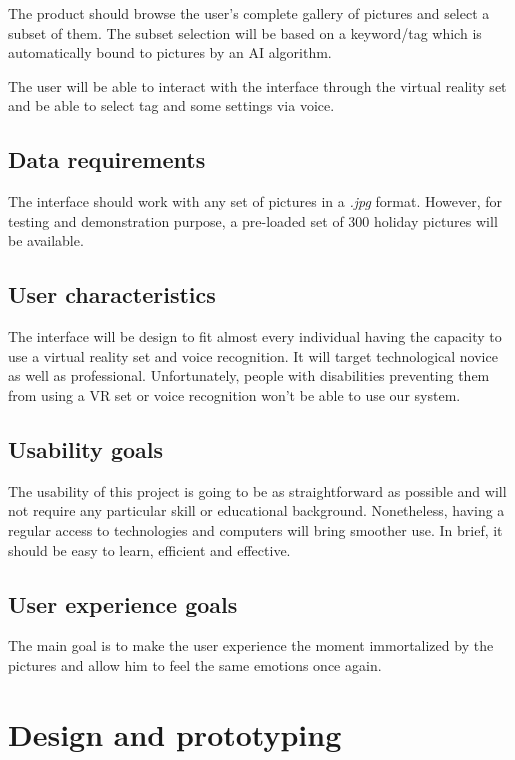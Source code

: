 \documentclass[11pt,a4paper]{article}
\begin{document}
The product should browse the user's complete gallery of pictures and select a subset of them. The subset selection will be based on a keyword/tag which is automatically bound to pictures by an AI algorithm.

The user will be able to interact with the interface through the virtual reality set and be able to select tag and some settings via voice.

\subsection{Data requirements}

The interface should work with any set of pictures in a \textit{.jpg} format. However, for testing and demonstration purpose, a pre-loaded set of 300 holiday pictures will be available.

\subsection{User characteristics}

The interface will be design to fit almost every individual having the capacity to use a virtual reality set and voice recognition. It will target technological novice as well as professional. Unfortunately, people with disabilities preventing them from using a VR set or voice recognition won't be able to use our system.

\subsection{Usability goals}

The usability of this project is going to be as straightforward as possible and will not require any particular skill or educational background. Nonetheless, having a regular access to technologies and computers will bring smoother use. In brief, it should be easy to learn, efficient and effective.

\subsection{User experience goals}

The main goal is to make the user experience the moment immortalized by the pictures and allow him to feel the same emotions once again. %

\section{Design and prototyping}
\end{document}
